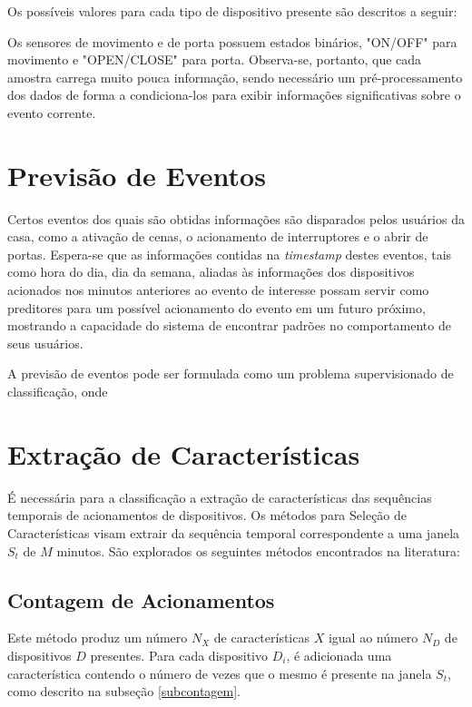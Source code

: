 \documentclass[
	12pt,				%
	openright,			%
	twoside,			%
	a4paper,			%
	english,			%
	spanish,			%
	brazil,				%
	]{abntex2}\usepackage[]{graphicx}\usepackage[]{color}
\begin{document}
Os possíveis valores para cada tipo de dispositivo presente são descritos a seguir:

Os sensores de movimento e de porta possuem estados binários, "ON/OFF" para movimento e "OPEN/CLOSE" para porta. Observa-se, portanto, que cada amostra carrega muito pouca informação, sendo necessário um pré-processamento dos dados de forma a condiciona-los para exibir informações significativas sobre o evento corrente.

\section{Previsão de Eventos}

Certos eventos dos quais são obtidas informações são disparados pelos usuários da casa, como a ativação de cenas, o acionamento de interruptores e o abrir de portas. Espera-se que as informações contidas na \textit{timestamp} destes eventos, tais como hora do dia, dia da semana, aliadas às informações dos dispositivos acionados nos minutos anteriores ao evento de interesse possam servir como preditores para um possível acionamento do evento em um futuro próximo, mostrando a capacidade do sistema de encontrar padrões no comportamento de seus usuários.

A previsão de eventos pode ser formulada como um problema supervisionado de classificação, onde 

\section{Extração de Características}

É necessária para a classificação a extração de características das sequências temporais de acionamentos de dispositivos. Os métodos para Seleção de Características visam extrair da sequência temporal correspondente a uma janela $S_t$ de $M$ minutos. São explorados os seguintes métodos encontrados na literatura:

\subsection{Contagem de Acionamentos}

Este método produz um número $N_X$ de características $X$ igual ao número $N_D$ de dispositivos $D$ presentes. Para cada dispositivo $D_i$, é adicionada uma característica contendo o número de vezes que o mesmo é presente na janela $S_t$, como descrito na subseção \ref{subcontagem}.
\end{document}
